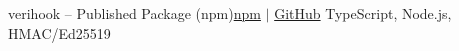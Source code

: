 \documentclass[a4paper,10pt]{article}
\begin{document}
    \resumeSubheading
      {verihook -- Published Package (npm)}{\href{https://www.npmjs.com/package/verihook}{npm} $|$ \href{https://github.com/creatorpiyush/verihook}{GitHub}}
      {TypeScript, Node.js, HMAC/Ed25519}{}
      \resumeItemListStart
      \resumeItemListEnd

  \resumeSubHeadingListEnd


\end{document}
